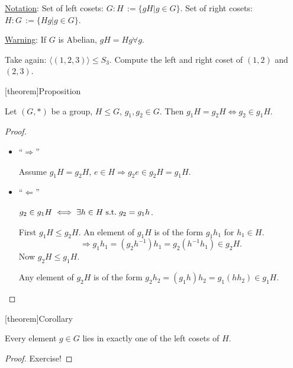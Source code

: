 \documentclass[12pt]{report}
\theoremstyle{definition}
\begin{document}
\underline{Notation}: Set of left cosets: $G:H \,:= \{gH | g \in G\}$.
Set of right cosets: $H:G \,:= \{Hg | g \in G\}$.

\underline{Warning}: If $G$ is Abelian, $gH = Hg \forall g$.

\begin{ex}
    Take again: $\langle (1, 2, 3)\rangle \le S_3$.
    Compute the left and right coset of $(1, 2)$ and $(2, 3)$.
\end{ex}

[theorem]{Proposition}
\begin{coset property}
    Let $(G, *)$ be a group, $H \le G$, $g_1, g_2 \in G$.
    Then $g_1 H = g_2 H \iff g_2 \in g_1 H$.
\end{coset property}

\begin{proof}
   \;

    \begin{itemize}
            \item ``$\Rightarrow{}$''

                Assume $g_1 H = g_2 H$, $e \in H \Rightarrow{} g_2 e \in g_2 H = g_1 H$.
                
            \item ``$\Leftarrow$''

                $g_2 \in g_1 H \iff \exists h \in H \;\textnormal{s.t.}\; g_2 = g_1 h$.

                First $g_1 H \le g_2 H$.
                An element of $g_1 H$ is of the form $g_1 h_1$ for $h_1 \in H$.
                \[
                    \Rightarrow{} g_1 h_1 = (g_2 h^{-1}) h_1 = g_2 (h^{-1} h_1) \in g_2 H.
                \]
                Now $g_2 H \le g_1 H$.

                Any element of $g_2 H$ is of the form $g_2 h_2
                = (g_1 h) h_2 = g_1 (h h_2) \in g_1 H$.
    \end{itemize}
\end{proof}

[theorem]{Corollary}
\begin{g in one of the left coset of H}
    Every element $g \in G$ lies in exactly one of the left cosets of $H$.
\end{g in one of the left coset of H}

\begin{proof}
    Exercise!
\end{proof}
\end{document}
